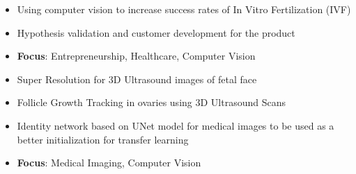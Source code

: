 \documentclass[10pt,a4paper]{altacv}
\begin{document}
\tagline{}
\personalinfo{
    \email{\href{mailto:anshulgupta0803@gmail.com}{anshulgupta0803@gmail.com}}%
    \phone{+91 916 662 8880}
    \homepage{\href{https://bit.ly/ansh0803}{bit.ly/ansh0803}}
}

\begin{fullwidth}
	\makecvheader
\end{fullwidth}


\begin{itemize}
    \item Using computer vision to increase success rates of In Vitro Fertilization (IVF)
    \item Hypothesis validation and customer development for the product
	\item \textbf{Focus}: Entrepreneurship, Healthcare, Computer Vision
\end{itemize}

\divider

\begin{itemize}
    \item Super Resolution for 3D Ultrasound images of fetal face
    \item Follicle Growth Tracking in ovaries using 3D Ultrasound Scans
	\item Identity network based on UNet model for medical images to be used as a better initialization for transfer learning 
	\item \textbf{Focus}: Medical Imaging, Computer Vision
\end{itemize}
\end{document}
